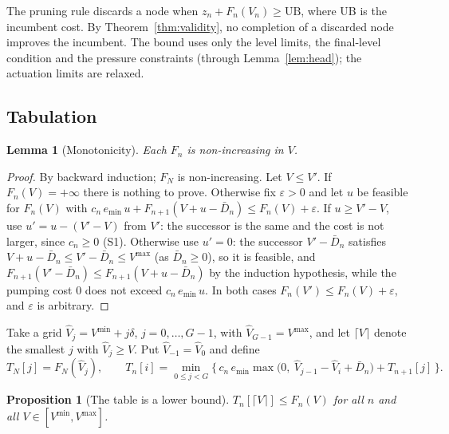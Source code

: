 \documentclass[11pt]{article}
\newtheorem{lemma}{Lemma}
\newtheorem{proposition}{Proposition}
\theoremstyle{remark}
\newcommand{\emin}{e_{\min}}
\newcommand{\Vmin}{V^{\min}}
\newcommand{\Vmax}{V^{\max}}
\begin{document}
The pruning rule discards a node when $z_n + F_n(V_n) \ge \mathrm{UB}$, where UB is the
incumbent cost. By Theorem~\ref{thm:validity}, no completion of a discarded node improves
the incumbent. The bound uses only the level limits, the final-level condition and the
pressure constraints (through Lemma~\ref{lem:head}); the actuation limits are relaxed.

\subsection{Tabulation}\label{sec:table}

\begin{lemma}[Monotonicity]\label{lem:monotone}
Each $F_n$ is non-increasing in $V$.
\end{lemma}

\begin{proof}
By backward induction; $F_N$ is non-increasing. Let $V \le V'$. If $F_n(V) = +\infty$
there is nothing to prove. Otherwise fix $\varepsilon > 0$ and let $u$ be feasible for
$F_n(V)$ with $c_n\, \emin\, u + F_{n+1}(V + u - \bar D_n) \le F_n(V) + \varepsilon$. If
$u \ge V' - V$, use $u' = u - (V' - V)$ from $V'$: the successor is the same and the cost
is not larger, since $c_n \ge 0$ (S1). Otherwise use $u' = 0$: the successor
$V' - \bar D_n$ satisfies $V + u - \bar D_n \le V' - \bar D_n \le \Vmax$ (as
$\bar D_n \ge 0$), so it is feasible, and
$F_{n+1}(V' - \bar D_n) \le F_{n+1}(V + u - \bar D_n)$ by the induction hypothesis, while
the pumping cost $0$ does not exceed $c_n\, \emin\, u$. In both cases
$F_n(V') \le F_n(V) + \varepsilon$, and $\varepsilon$ is arbitrary.
\end{proof}

Take a grid $\hat V_j = \Vmin + j\delta$, $j = 0, \dots, G-1$, with
$\hat V_{G-1} = \Vmax$, and let $\lceil V \rceil$ denote the smallest $j$ with
$\hat V_j \ge V$. Put $\hat V_{-1} = \hat V_0$ and define
\[
  T_N[j] = F_N(\hat V_j), \qquad
  T_n[i] = \min_{0 \le j < G} \bigl\{\, c_n\, \emin \max\bigl(0,\ \hat V_{j-1} - \hat V_i
  + \bar D_n\bigr) + T_{n+1}[j] \,\bigr\}.
\]

\begin{proposition}[The table is a lower bound]\label{prop:table}
$T_n[\lceil V \rceil] \le F_n(V)$ for all $n$ and all $V \in [\Vmin, \Vmax]$.
\end{proposition}
\end{document}
